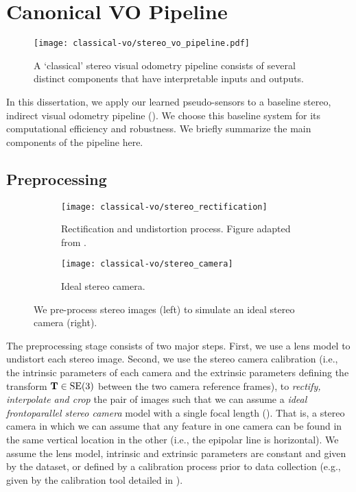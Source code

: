\section{Canonical VO Pipeline}

\begin{figure}[h!]
\begin{center}
		\texttt{[image: classical-vo/stereo\_vo\_pipeline.pdf]}
		\caption{A `classical' stereo visual odometry pipeline consists of several distinct components that have interpretable inputs and outputs.}
  	\label{fig:vo_stereo_vo_pipeline}
\end{center}
\end{figure}

In this dissertation, we apply our learned pseudo-sensors to a baseline stereo, indirect visual odometry pipeline (). We choose this baseline system for its computational efficiency and robustness. We briefly summarize the main components of the pipeline here.



\subsection{Preprocessing}


\begin{figure}[h!]
     \centering
     \begin{subfigure}[b]{0.48\textwidth}
         \centering
         \texttt{[image: classical-vo/stereo\_rectification]}
        \caption{Rectification and undistortion process. Figure adapted from \cite{florez2010}.}
         \label{fig:vo_undistort_recitfy}
	 \end{subfigure}
	 \begin{subfigure}[b]{0.48\textwidth}
         \centering
     		\texttt{[image: classical-vo/stereo\_camera]}
			\caption{Ideal stereo camera.}
			 \label{fig:vo_stereo_camera}
     \end{subfigure}
    \caption{We pre-process stereo images (left) to simulate an ideal stereo camera (right).}
        \label{fig:vo_preprocessing}
\end{figure}
The preprocessing stage consists of two major steps. First, we use a lens model to undistort each stereo image. Second, we use the stereo camera calibration (i.e., the intrinsic parameters of each camera and the extrinsic parameters defining the transform $\boldsymbol{\mathbf{T}} \in \mathrm{SE}(3)$ between the two camera reference frames), to \textit{rectify, interpolate and crop} the pair of images such that we can assume a \textit{ideal frontoparallel stereo camera} model with a single focal length (). That is, a stereo camera in which we can assume that any feature in one camera can be found in the same vertical location in the other (i.e., the epipolar line is horizontal). We assume the lens model, intrinsic and extrinsic parameters are constant and given by the dataset, or defined by a calibration process prior to data collection (e.g., given by the calibration tool detailed in \cite{Furgale2013-sl}).

